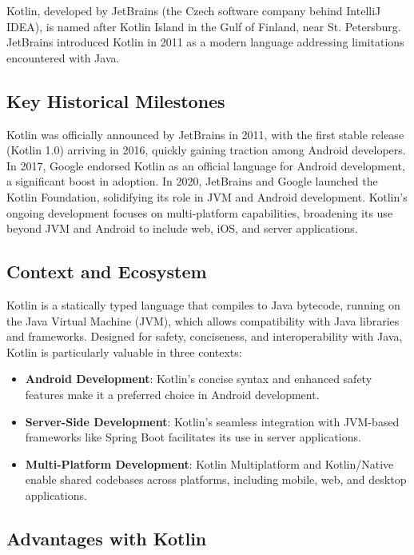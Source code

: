 Kotlin, developed by JetBrains (the Czech software company behind IntelliJ IDEA), is named after Kotlin Island in the Gulf of Finland, near St. Petersburg. JetBrains introduced Kotlin in 2011 as a modern language addressing limitations encountered with Java.

\subsection{Key Historical Milestones}

Kotlin was officially announced by JetBrains in 2011, with the first stable release (Kotlin 1.0) arriving in 2016, quickly gaining traction among Android developers. In 2017, Google endorsed Kotlin as an official language for Android development, a significant boost in adoption. In 2020, JetBrains and Google launched the Kotlin Foundation, solidifying its role in JVM and Android development. Kotlin’s ongoing development focuses on multi-platform capabilities, broadening its use beyond JVM and Android to include web, iOS, and server applications.

\subsection{Context and Ecosystem}

Kotlin is a statically typed language that compiles to Java bytecode, running on the Java Virtual Machine (JVM), which allows compatibility with Java libraries and frameworks. Designed for safety, conciseness, and interoperability with Java, Kotlin is particularly valuable in three contexts:

\begin{itemize}
    \item \textbf{Android Development}: Kotlin’s concise syntax and enhanced safety features make it a preferred choice in Android development.
    \item \textbf{Server-Side Development}: Kotlin’s seamless integration with JVM-based frameworks like Spring Boot facilitates its use in server applications.
    \item \textbf{Multi-Platform Development}: Kotlin Multiplatform and Kotlin/Native enable shared codebases across platforms, including mobile, web, and desktop applications.
\end{itemize}

\subsection{Advantages with Kotlin}

